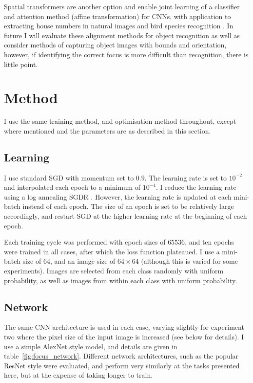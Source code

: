 Spatial transformers \cite{Jaderberg2015} are another option and enable joint learning of a classifier and attention method (affine transformation) for \gls{CNN}s, with application to extracting house numbers in natural images \cite{Netzer2011} and bird species recognition \cite{Wah2011}. In future I will evaluate these alignment methods for object recognition as well as consider methods of capturing object images with bounds and orientation, however, if identifying the correct focus is more difficult than recognition, there is little point.


\section{Method}

I use the same training method, and optimisation method throughout, except where mentioned and the parameters are as described in this section. 

\subsection {Learning}

I use standard \gls{SGD} with momentum set to $ 0.9 $. The learning rate is set to $ 10^{-2} $ and interpolated each epoch to a minimum of $ 10^{-4} $. I reduce the learning rate using a log annealing \gls{SGDR}  \cite{Loshchilov2016}. However, the learning rate is updated at each mini-batch instead of each epoch. The size of an epoch is set to be relatively large accordingly, and restart SGD at the higher learning rate at the beginning of each epoch. 

Each training cycle was performed with epoch sizes of $65536$, and ten epochs were trained in all cases, after which the loss function plateaued. I use a mini-batch size of $64$, and an image size of $64\times64$ (although this is varied for some experiments). Images are selected from each class randomly with uniform probability, as well as images from within each class with uniform probability.

\subsection {Network}

The same CNN architecture is used in each case, varying slightly for experiment two where the pixel size of the input image is increased (see below for details). I use a simple AlexNet \cite {Krizhevsky2012} style model, and details are given in table~\ref{fig:focus_network}. Different network architectures, such as the popular ResNet \cite{He2015} style were evaluated, and perform very similarly at the tasks presented here, but at the expense of taking longer to train.

